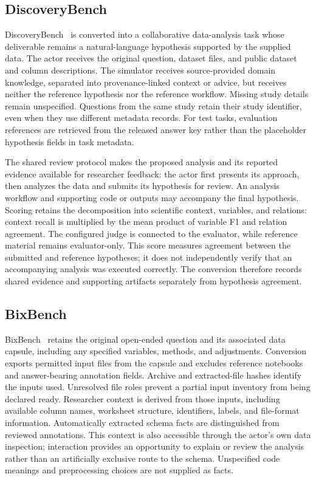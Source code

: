 \subsection{DiscoveryBench}
\label{app:discoverybench}
DiscoveryBench~\cite{majumder2024discoverybench} is converted into a
collaborative data-analysis task whose deliverable remains a natural-language
hypothesis supported by the supplied data. The actor receives the original
question, dataset files, and public dataset and column descriptions. The
simulator receives source-provided domain knowledge, separated into
provenance-linked context or advice, but receives neither the reference
hypothesis nor the reference workflow. Missing study details remain
unspecified. Questions from the same study retain their study identifier,
even when they use different metadata records. For test tasks, evaluation
references are retrieved from the released answer key rather than the
placeholder hypothesis fields in task metadata.

The shared review protocol makes the proposed analysis and its reported
evidence available for researcher feedback: the actor first presents its
approach, then analyzes the data and submits its hypothesis for review.
An analysis workflow and supporting code or outputs may accompany the final
hypothesis. Scoring retains the decomposition into scientific context,
variables, and relations: context recall is multiplied by the mean product
of variable F1 and relation agreement. The configured judge is connected to
the evaluator, while reference material remains evaluator-only.
This score measures agreement between the submitted and reference hypotheses;
it does not independently verify that an accompanying analysis was executed
correctly. The conversion therefore records shared evidence and supporting
artifacts separately from hypothesis agreement.

\subsection{BixBench}
\label{app:bixbench}
BixBench~\cite{mitchener2025bixbench} retains the original open-ended question
and its associated data capsule, including any specified variables, methods,
and adjustments. Conversion exports permitted input files from the capsule
and excludes reference notebooks and answer-bearing annotation fields.
Archive and extracted-file hashes identify the inputs used. Unresolved file
roles prevent a partial input inventory from being declared ready. Researcher
context is derived from those inputs, including available column names,
worksheet structure, identifiers, labels, and file-format information.
Automatically extracted schema facts are distinguished from reviewed
annotations. This context is also accessible through the actor's own data
inspection; interaction provides an opportunity to explain or review the
analysis rather than an artificially exclusive route to the schema.
Unspecified code meanings and preprocessing choices are not supplied as facts.

